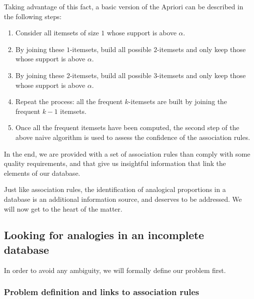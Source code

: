 Taking advantage of this fact, a basic version of the Apriori can be described
in the following steps:
\begin{enumerate}
  \item Consider all itemsets of size $1$ whose support is above $\alpha$.
  \item By joining these $1$-itemsets, build all possible $2$-itemsets and only
    keep those whose support is above $\alpha$.
  \item By joining these $2$-itemsets, build all possible $3$-itemsets and only
    keep those whose support is above $\alpha$.
  \item Repeat the process: all the frequent $k$-itemsets are built by joining
    the frequent $k-1$ itemsets.
  \item Once all the frequent itemsets have been computed, the second step of
    the above naive algorithm is used to assess the confidence of the
    association rules.
\end{enumerate}
In the end, we are provided with a set of association rules than comply with
some quality requirements, and that give us insightful information that link
the elements of our database.


Just like association rules, the identification of analogical proportions in a
database is an additional information source, and deserves to be addressed. We
will now get to the heart of the matter.

\subsection{Looking for analogies in an incomplete database}

In order to avoid any ambiguity, we will formally define our problem first.
\subsubsection{Problem definition and links to association rules}


